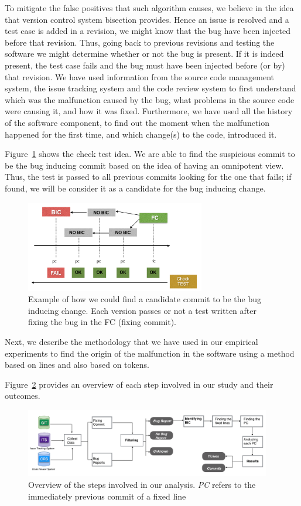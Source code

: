 \documentclass[a4paper]{article}
\begin{document}
To mitigate the false positives that such algorithm causes, we believe in the idea that version control system bisection provides. Hence an issue is resolved and a test case is added in a revision, we might know that the bug have been injected before that revision. Thus, going back to previous revisions and testing the software we might determine whether or not the bug is present. If it is indeed present, the test case fails and the bug must have been injected before (or by) that revision. We have used information from the source code management system, the issue tracking system and the code review system to first understand which was the malfunction caused by the bug, what problems in the source code were causing it, and how it was fixed. Furthermore, we have used all the history of the software component, to find out the moment when the malfunction happened for the first time, and which change(s) to the code, introduced it. 

Figure~\ref{fig:test} shows the check test idea. We are able to find the suspicious commit to be the bug inducing commit based on the idea of having an omnipotent view. Thus, the test is passed to all previous commits looking for the one that fails; if found, we will be consider it as a candidate for the bug inducing change.

\begin{figure}[ht]
\centering
\includegraphics[height=4cm]{testrecursive.png}
\caption{Example of how we could find a candidate commit to be the  bug inducing change. Each version passes or not a test written after fixing the bug in the FC (fixing commit).}
\label{fig:test}      
\end{figure}

Next, we describe the methodology that we have used in our empirical experiments to find the origin of the malfunction in the software using a method based on lines and also based on tokens. 

Figure~\ref{fig:diagram} provides an overview of each step involved in our study and their outcomes.

\begin{figure}[ht]
\centering
\includegraphics[height=3cm]{diagram.png}
\caption{Overview of the steps involved in our analysis. \emph{PC} refers to the immediately previous commit of a fixed line }
\label{fig:diagram}       %
\end{figure}
\end{document}
